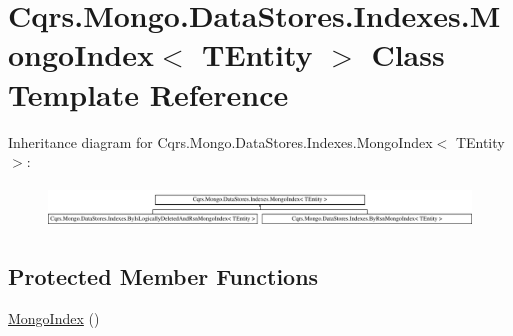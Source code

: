 \hypertarget{classCqrs_1_1Mongo_1_1DataStores_1_1Indexes_1_1MongoIndex}{}\section{Cqrs.\+Mongo.\+Data\+Stores.\+Indexes.\+Mongo\+Index$<$ T\+Entity $>$ Class Template Reference}
\label{classCqrs_1_1Mongo_1_1DataStores_1_1Indexes_1_1MongoIndex}
Inheritance diagram for Cqrs.\+Mongo.\+Data\+Stores.\+Indexes.\+Mongo\+Index$<$ T\+Entity $>$\+:\begin{figure}[H]
\begin{center}
\leavevmode
\includegraphics[height=1.122244cm]{classCqrs_1_1Mongo_1_1DataStores_1_1Indexes_1_1MongoIndex}
\end{center}
\end{figure}
\subsection*{Protected Member Functions}
\begin{DoxyCompactItemize}
\item 
\hyperlink{classCqrs_1_1Mongo_1_1DataStores_1_1Indexes_1_1MongoIndex_a7affbb063520cd8c8bda27f8478efd06}{Mongo\+Index} ()
\end{DoxyCompactItemize}
